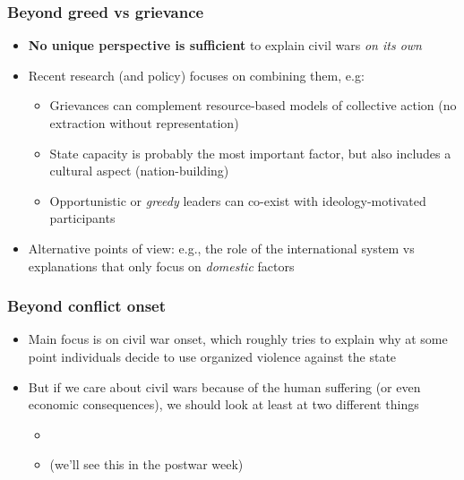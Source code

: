 \documentclass[aspectratio=43]{beamer}
\begin{document}
\begin{frame}
\frametitle{Beyond greed vs grievance}
\centering

\begin{itemize}
  \item \textbf{No unique perspective is sufficient} to explain civil wars \textit{on its own}
  \item Recent research (and policy) focuses on combining them, e.g:
  \begin{itemize}
    \item<2-> Grievances can complement resource-based models of collective action (no extraction without representation)
    \item<3-> State capacity is probably the most important factor, but also includes a cultural aspect (nation-building)
    \item<4-> Opportunistic or \textit{greedy} leaders can co-exist with ideology-motivated participants
  \end{itemize}
  \item<5-> Alternative points of view: e.g., the role of the international system vs explanations that only focus on \textit{domestic} factors
\end{itemize}

\end{frame}

\begin{frame}
\frametitle{Beyond conflict onset}
\centering

\begin{itemize}
  \item Main focus is on civil war onset, which roughly tries to explain why at some point individuals decide to use organized violence against the state
  \item But if we care about civil wars because of the human suffering (or even economic consequences), we should look at least at two different things
  \begin{itemize}
    \item {}
    \item {} (we'll see this in the postwar week)
  \end{itemize}
\end{itemize}

\end{frame}
\end{document}
